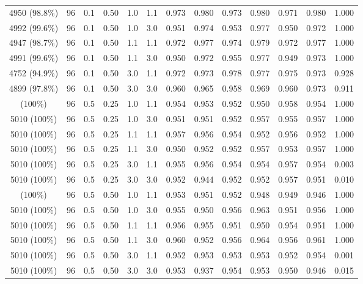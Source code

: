 \begin{longtable}[t]{ccccccrrrrrrc}
4950 (98.8\%) & 96 & 0.1 & 0.50 & 1.0 & 1.1 & 0.973 & 0.980 & 0.973 & 0.980 & 0.971 & 0.980 & 1.000\\
4992 (99.6\%) & 96 & 0.1 & 0.50 & 1.0 & 3.0 & 0.951 & 0.974 & 0.953 & 0.977 & 0.950 & 0.972 & 1.000\\
4947 (98.7\%) & 96 & 0.1 & 0.50 & 1.1 & 1.1 & 0.972 & 0.977 & 0.974 & 0.979 & 0.972 & 0.977 & 1.000\\
4991 (99.6\%) & 96 & 0.1 & 0.50 & 1.1 & 3.0 & 0.950 & 0.972 & 0.955 & 0.977 & 0.949 & 0.973 & 1.000\\
4752 (94.9\%) & 96 & 0.1 & 0.50 & 3.0 & 1.1 & 0.972 & 0.973 & 0.978 & 0.977 & 0.975 & 0.973 & 0.928\\
4899 (97.8\%) & 96 & 0.1 & 0.50 & 3.0 & 3.0 & 0.960 & 0.965 & 0.958 & 0.969 & 0.960 & 0.973 & 0.911\\
\addlinespace
5010 (100\%) & 96 & 0.5 & 0.25 & 1.0 & 1.1 & 0.954 & 0.953 & 0.952 & 0.950 & 0.958 & 0.954 & 1.000\\
5010 (100\%) & 96 & 0.5 & 0.25 & 1.0 & 3.0 & 0.951 & 0.951 & 0.952 & 0.957 & 0.955 & 0.957 & 1.000\\
5010 (100\%) & 96 & 0.5 & 0.25 & 1.1 & 1.1 & 0.957 & 0.956 & 0.954 & 0.952 & 0.956 & 0.952 & 1.000\\
5010 (100\%) & 96 & 0.5 & 0.25 & 1.1 & 3.0 & 0.950 & 0.952 & 0.952 & 0.957 & 0.953 & 0.957 & 1.000\\
5010 (100\%) & 96 & 0.5 & 0.25 & 3.0 & 1.1 & 0.955 & 0.956 & 0.954 & 0.954 & 0.957 & 0.954 & 0.003\\
5010 (100\%) & 96 & 0.5 & 0.25 & 3.0 & 3.0 & 0.952 & 0.944 & 0.952 & 0.952 & 0.957 & 0.951 & 0.010\\
\addlinespace
5010 (100\%) & 96 & 0.5 & 0.50 & 1.0 & 1.1 & 0.953 & 0.951 & 0.952 & 0.948 & 0.949 & 0.946 & 1.000\\
5010 (100\%) & 96 & 0.5 & 0.50 & 1.0 & 3.0 & 0.955 & 0.950 & 0.956 & 0.963 & 0.951 & 0.956 & 1.000\\
5010 (100\%) & 96 & 0.5 & 0.50 & 1.1 & 1.1 & 0.956 & 0.955 & 0.951 & 0.950 & 0.954 & 0.951 & 1.000\\
5010 (100\%) & 96 & 0.5 & 0.50 & 1.1 & 3.0 & 0.960 & 0.952 & 0.956 & 0.964 & 0.956 & 0.961 & 1.000\\
5010 (100\%) & 96 & 0.5 & 0.50 & 3.0 & 1.1 & 0.952 & 0.953 & 0.953 & 0.953 & 0.952 & 0.954 & 0.001\\
5010 (100\%) & 96 & 0.5 & 0.50 & 3.0 & 3.0 & 0.953 & 0.937 & 0.954 & 0.953 & 0.950 & 0.946 & 0.015\\
\bottomrule
\end{longtable}
\endgroup{}
